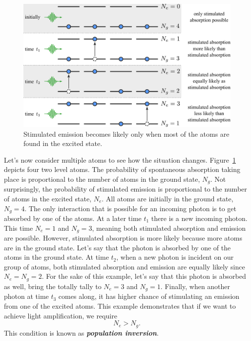 \begin{figure}[t]
    \centering
    \includegraphics[width=\textwidth]{lesson5/5-3_population_inversion.pdf}
    \caption[Population inversion]{Stimulated emission becomes likely only when most of the atoms are found in the excited state.}
    \label{fig:5-3_population_inversion}
\end{figure}

Let's now consider multiple atoms to see how the situation changes.
Figure~\ref{fig:5-3_population_inversion} depicts four two level atoms.
The probability of spontaneous absorption taking place is proportional to the number of atoms in the ground state, $N_g$.
Not surprisingly, the probability of stimulated emission is proportional to the number of atoms in the excited state, $N_e$.
All atoms are initially in the ground state, $N_g=4$.
The only interaction that is possible for an incoming photon is to get absorbed by one of the atoms.
At a later time $t_1$ there is a new incoming photon.
This time $N_e=1$ and $N_g=3$, meaning both stimulated absorption and emission are possible.
However, stimulated absorption is more likely because more atoms are in the ground state.
Let's say that the photon is absorbed by one of the atoms in the ground state.
At time $t_2$, when a new photon is incident on our group of atoms, both stimulated absorption and emission are equally likely since $N_e=N_g=2$.
For the sake of this example, let's say that this photon is absorbed as well, bring the totally tally to $N_e=3$ and $N_g=1$.
Finally, when another photon at time $t_3$ comes along, it has higher chance of stimulating an emission from one of the excited atoms.
This example demonstrates that if we want to achieve light amplification, we require
\begin{equation}
    N_e > N_g.
\end{equation}
This condition is known as \textit{\textbf{population inversion}}.

